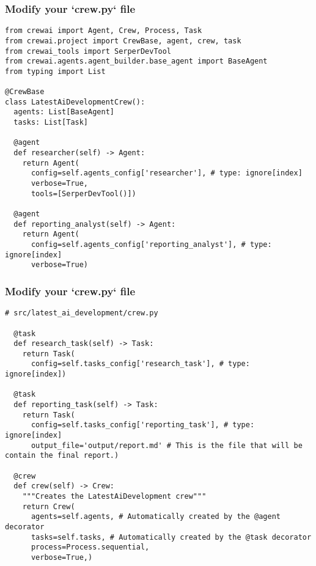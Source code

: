 \begin{frame}[fragile]\frametitle{Modify your `crew.py` file}


    \begin{lstlisting}
from crewai import Agent, Crew, Process, Task
from crewai.project import CrewBase, agent, crew, task
from crewai_tools import SerperDevTool
from crewai.agents.agent_builder.base_agent import BaseAgent
from typing import List

@CrewBase
class LatestAiDevelopmentCrew():
  agents: List[BaseAgent]
  tasks: List[Task]

  @agent
  def researcher(self) -> Agent:
    return Agent(
      config=self.agents_config['researcher'], # type: ignore[index]
      verbose=True,
      tools=[SerperDevTool()])

  @agent
  def reporting_analyst(self) -> Agent:
    return Agent(
      config=self.agents_config['reporting_analyst'], # type: ignore[index]
      verbose=True)
    \end{lstlisting}	
\end{frame}

\begin{frame}[fragile]\frametitle{Modify your `crew.py` file}


    \begin{lstlisting}
# src/latest_ai_development/crew.py

  @task
  def research_task(self) -> Task:
    return Task(
      config=self.tasks_config['research_task'], # type: ignore[index])

  @task
  def reporting_task(self) -> Task:
    return Task(
      config=self.tasks_config['reporting_task'], # type: ignore[index]
      output_file='output/report.md' # This is the file that will be contain the final report.)

  @crew
  def crew(self) -> Crew:
    """Creates the LatestAiDevelopment crew"""
    return Crew(
      agents=self.agents, # Automatically created by the @agent decorator
      tasks=self.tasks, # Automatically created by the @task decorator
      process=Process.sequential,
      verbose=True,)
    \end{lstlisting}	
\end{frame}


